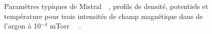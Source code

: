 \begin{refsection}
\begin{figure}[!htbp] 
  \centering
    \caption{Paramètres typiques de Mistral~~, profils de
    densité, potentiels et température pour trois intensités
    de champ magnétique dans de l'argon à 10$^{-4}$
    mTorr~~
    \parencite{Oldenburger}.}
    \label{4-MistralExp}
\end{figure}


\end{refsection}
